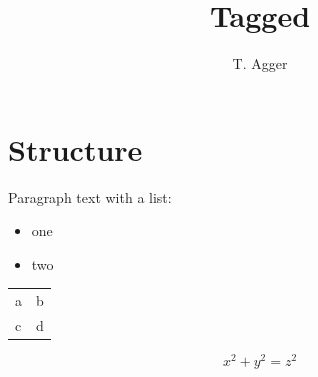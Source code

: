 \documentclass{article}
\title{Tagged}\author{T. Agger}
\begin{document}
\maketitle
\section{Structure}Paragraph text with a list:
\begin{itemize}\item one \item two\end{itemize}
\begin{tabular}{ll}a&b\\c&d\end{tabular}
\[x^2+y^2=z^2\]
\end{document}
